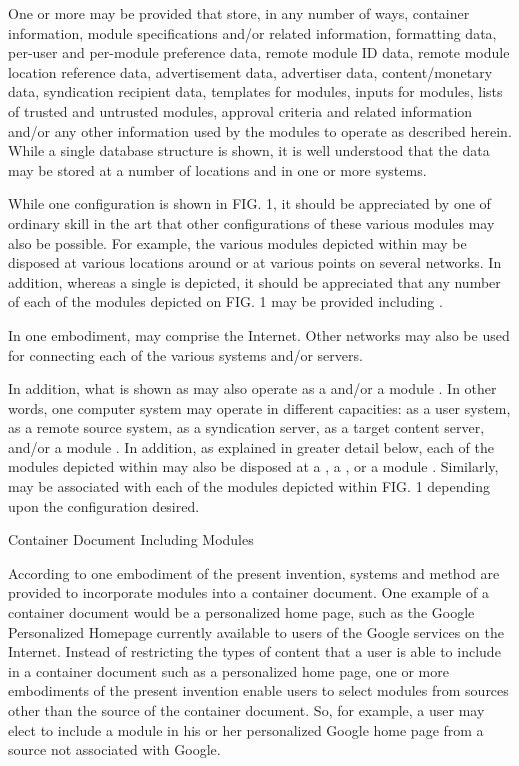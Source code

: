 One
or more \databasesystems{} may be provided that store, in any
number of ways, container information, module specifications and/or
related information, formatting data, per-user and per-module
preference data, remote module ID data, remote module location
reference data, advertisement data, advertiser data, content/monetary
data, syndication recipient data, templates for modules, inputs for
modules, lists of trusted and untrusted modules, approval criteria and
related information and/or any other information used by the modules
to operate as described herein. While a single database structure is
shown, it is well understood that the data may be stored at a number
of locations and in one or more systems.



While one configuration is shown in FIG. 1, it should be
appreciated by one of ordinary skill in the art that other
configurations of these various modules may also be possible. For
example, the various modules depicted within \hostserversystem{}
may be disposed at various locations around \network{} or at various points on several networks. In addition,
whereas a single \hostserversystem{} is depicted, it should
be appreciated that any number of each of the modules depicted on
FIG. 1 may be provided including \network{}.



In one embodiment, \network{} may comprise the
Internet. Other networks may also be used for connecting each of the
various systems and/or servers.



In addition,
what is shown as \usersystem{} may also operate as a \remotesourcesystem{} and/or a module \developersystem. In
other words, one computer system may operate in different capacities:
as a user system, as a remote source system, as a syndication server,
as a target content server, and/or a module \developersystem. In
addition, as explained in greater detail below, each of the modules
depicted within \hostserversystem{} may also be disposed at a
\usersystem{}, a \remotesourcesystem, or a module
\developersystem. Similarly, \databasesystems{} may be
associated with each of the modules depicted within FIG. 1 depending
upon the configuration desired.

Container Document Including Modules


According to one embodiment of the present
invention, systems and method are provided to incorporate modules into
a container document. One example of a container document would be a
personalized home page, such as the Google Personalized Homepage
currently available to users of the Google services on the
Internet. Instead of restricting the types of content that a user is
able to include in a container document such as a personalized home
page, one or more embodiments of the present invention enable users to
select modules from sources other than the source of the container
document. So, for example, a user may elect to include a module in his
or her personalized Google home page from a source not associated with
Google.



